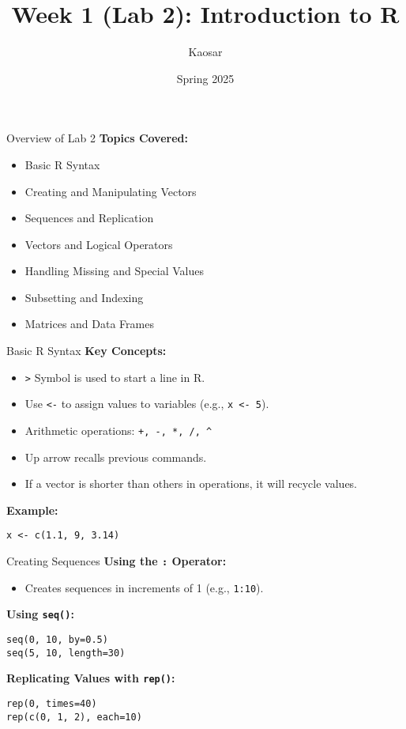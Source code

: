\documentclass{beamer}
\title{Week 1 (Lab 2): Introduction to R}
\author{Kaosar}
\institute{Auburn University}
\date{Spring 2025}
\begin{document}
\frame{\titlepage}

\begin{frame}{Overview of Lab 2}
\textbf{Topics Covered:}
\begin{itemize}
    \item Basic R Syntax
    \item Creating and Manipulating Vectors
    \item Sequences and Replication
    \item  Vectors and Logical Operators
    \item Handling Missing and Special Values
    \item Subsetting and Indexing
    \item Matrices and Data Frames
\end{itemize}
\end{frame}

\begin{frame}[fragile]{Basic R Syntax}
\textbf{Key Concepts:}
\begin{itemize}
    \item \texttt{>} Symbol is used to start a line in R.
    \item Use \texttt{<-} to assign values to variables (e.g., \texttt{x <- 5}).
    \item Arithmetic operations: \texttt{+, -, *, /, \textasciicircum}
    \item Up arrow recalls previous commands.
    \item If a vector is shorter than others in operations, it will recycle values.
\end{itemize}
\textbf{Example:}
\begin{verbatim}
x <- c(1.1, 9, 3.14)
\end{verbatim}
\end{frame}

\begin{frame}[fragile]{Creating Sequences}
\textbf{Using the \texttt{:} Operator:}
\begin{itemize}
    \item Creates sequences in increments of 1 (e.g., \texttt{1:10}).
\end{itemize}
\textbf{Using \texttt{seq()}:}
\begin{verbatim}
seq(0, 10, by=0.5)
seq(5, 10, length=30)
\end{verbatim}
\textbf{Replicating Values with \texttt{rep()}:}
\begin{verbatim}
rep(0, times=40)
rep(c(0, 1, 2), each=10)
\end{verbatim}
\end{frame}
\end{document}
